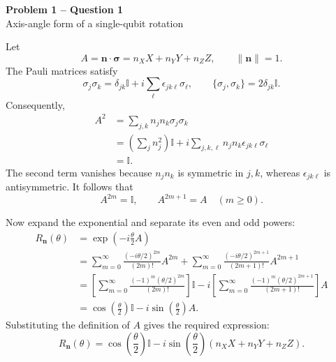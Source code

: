 \documentclass[11pt]{article}
\newcommand{\I}{\mathbb{I}}
\newcommand{\bsigma}{\boldsymbol{\sigma}}
\begin{document}
\begin{center}
  {\Large\bfseries Problem 1 -- Question 1}\\[0.3em]
  {\large Axis-angle form of a single-qubit rotation}
\end{center}

Let
\[
 A=\mathbf n\cdot\bsigma=n_X X+n_Y Y+n_Z Z,
 \qquad \|\mathbf n\|=1.
\]
The Pauli matrices satisfy
\[
 \sigma_j\sigma_k=\delta_{jk}\I+i\sum_{\ell}\epsilon_{jk\ell}\sigma_\ell,
 \qquad
 \{\sigma_j,\sigma_k\}=2\delta_{jk}\I .
\]
Consequently,
\begin{align*}
 A^2
 &=\sum_{j,k}n_jn_k\sigma_j\sigma_k\\
 &=\left(\sum_j n_j^2\right)\I
   +i\sum_{j,k,\ell}n_jn_k\epsilon_{jk\ell}\sigma_\ell\\
 &=\I.
\end{align*}
The second term vanishes because \(n_jn_k\) is symmetric in \(j,k\), whereas
\(\epsilon_{jk\ell}\) is antisymmetric. It follows that
\[
 A^{2m}=\I,\qquad A^{2m+1}=A
 \quad (m\geq 0).
\]

Now expand the exponential and separate its even and odd powers:
\begin{align*}
 R_{\mathbf n}(\theta)
 &=\exp\left(-i\frac{\theta}{2}A\right)\\
 &=\sum_{m=0}^{\infty}
   \frac{(-i\theta/2)^{2m}}{(2m)!}A^{2m}
  +\sum_{m=0}^{\infty}
   \frac{(-i\theta/2)^{2m+1}}{(2m+1)!}A^{2m+1}\\
 &=\left[\sum_{m=0}^{\infty}
   \frac{(-1)^m(\theta/2)^{2m}}{(2m)!}\right]\I
  -i\left[\sum_{m=0}^{\infty}
   \frac{(-1)^m(\theta/2)^{2m+1}}{(2m+1)!}\right]A\\
 &=\cos\left(\frac{\theta}{2}\right)\I
  -i\sin\left(\frac{\theta}{2}\right)A.
\end{align*}
Substituting the definition of \(A\) gives the required expression:
\[
\boxed{
R_{\mathbf n}(\theta)
=
\cos\left(\frac{\theta}{2}\right)\I
-i\sin\left(\frac{\theta}{2}\right)
\left(n_XX+n_YY+n_ZZ\right).
}
\]
\end{document}
